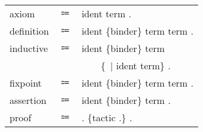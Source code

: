 \begin{table}[!htb]
\begin{tabular}{lcl}
        axiom
            &$\Coloneqq$&\fAxiom{} ident \scolon{} term .\\
        definition
            &$\Coloneqq$&\fDefinition{} ident \{binder\} \scolon{} term \scoloneq{} term .\\
        inductive
            &$\Coloneqq$&\fInductive{} ident \{binder\} \scolon{} term \scoloneq{}\\
            &&~~~~\{~$\mid$ ident \scolon{} term\} .\\
        fixpoint
            &$\Coloneqq$&\fFixpoint{} ident \{binder\} \scolon{} term \scoloneq{} term .\\
        assertion
            &$\Coloneqq$&\fTheorem{} ident \{binder\} \scolon{} term .\\
        proof
            &$\Coloneqq$&\fProof{} . \{tactic .\} \fQed{} .\\
    \end{tabular}
\end{table}
\newpage
